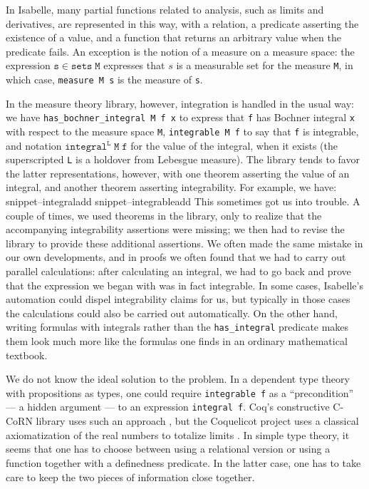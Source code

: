 \documentclass{svjour3}
\newcommand{\Snippet}[1]{\csname snippet--#1\endcsname}
\begin{document}
In Isabelle, many partial functions related to analysis, such as limits and derivatives, are represented in this way, with a relation, a predicate asserting the existence of a value, and a function that returns an arbitrary value when the predicate fails. An exception is the notion of a measure on a measure space: the expression $\mathtt{s} \in \mathtt{sets \; M}$ expresses that $s$ is a measurable set for the measure \texttt{M}, in which case, \texttt{measure M s} is the measure of \texttt{s}.

In the measure theory library, however, integration is handled in the usual way: we have \texttt{has\_bochner\_integral M f x} to express that \texttt{f} has Bochner integral \texttt{x} with respect to the measure space \texttt{M}, \texttt{integrable M f} to say that \texttt{f} is integrable, and notation $\mathtt{integral^L \; M \; f}$ for the value of the integral, when it exists (the superscripted \texttt{L} is a holdover from Lebesgue measure). The library tends to favor the latter representations, however, with one theorem asserting the value of an integral, and another theorem asserting integrability. For example, we have:
\Snippet{integraladd}
\Snippet{integrableadd}
This sometimes got us into trouble. A couple of times, we used theorems in the library, only to realize that the accompanying integrability assertions were missing; we then had to revise the library to provide these additional assertions. We often made the same mistake in our own developments, and in proofs we often found that we had to carry out parallel calculations: after calculating an integral, we had to go back and prove that the expression we began with was in fact integrable. In some cases, Isabelle's automation could dispel integrability claims for us, but typically in those cases the calculations could also be carried out automatically. On the other hand, writing formulas with integrals rather than the \texttt{has\_integral} predicate makes them look much more like the formulas one finds in an ordinary mathematical textbook.

We do not know the ideal solution to the problem. In a dependent type theory with propositions as types, one could require \texttt{integrable f} as a ``precondition'' --- a hidden argument --- to an expression \texttt{integral f}. Coq's constructive C-CoRN library uses such an approach \cite{krebbers:spitters:11}, but the Coquelicot project uses a classical axiomatization of the real numbers to totalize limits \cite{boldo:et:al:12}. In simple type theory, it seems that one has to choose between using a relational version or using a function together with a definedness predicate. In the latter case, one has to take care to keep the two pieces of information close together.
\end{document}
